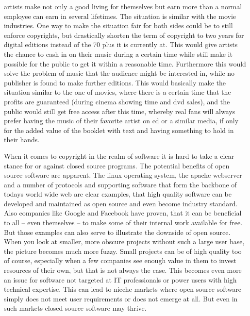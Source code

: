 \documentclass[a4paper]{report}
\begin{document}
artists make not only a good living for themselves but earn more than a normal employee can earn in several lifetimes. The situation is similar with the movie industries. One way to make the situation fair for both sides could be to still enforce copyrights, but drastically shorten the term of copyright to two years for digital editions instead of the 70 plus it is currently at. This would give artists the chance to cash in on their music during a certain time while still make it possible for the public to get it within a reasonable time. Furthermore this would solve the problem of music that the audience might be interested in, while no publisher is found to make further editions. This would basically make the situation similar to the one of movies, where there is a certain time that the profits are guaranteed (during cinema showing time and dvd sales), and the public would still get free access after this time, whereby real fans will always prefer having the music of their favorite artist on cd or a similar media, if only for the added value of the booklet with text and having something to hold in their hands.

When it comes to copyright in the realm of software it is hard to take a clear stance for or against closed source programs. The potential benefits of open source software are apparent. The linux operating system, the apache webserver and a number of protocols and supporting software that form the backbone of todays world wide web are clear examples, that high quality software can be developed and maintained as open source and even become industry standard. Also companies like Google and Facebook have proven, that it can be beneficial to all -- even themselves -- to make some of their internal work available for free. But those examples can also serve to illustrate the downside of open source. When you look at smaller, more obscure projects without such a large user base, the picture becomes much more fuzzy. Small projects can be of high quality too of course, especially when a few companies see enough value in them to invest resources of their own, but that is not always the case. This becomes even more an issue for software not targeted at IT professionals or power users with high technical expertise. This can lead to nieche markets where open source software simply does not meet user requirements or does not emerge at all. But even in such markets closed source software may thrive.
\end{document}
